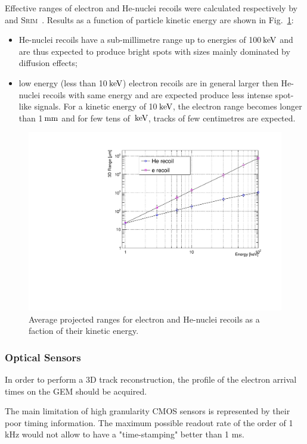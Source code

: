 \documentclass[physics,article,submit,moreauthors,pdftex]{Definitions/mdpi}
\newcommand{\SRIM} {{\textsc{Srim}}\xspace}
\newcommand{\unit}[1]{\ensuremath{\textrm{\,#1}}\xspace}
\newcommand{\keV}{\ensuremath{\,\textrm{ke\hspace{-.08em}V}}\xspace}
\begin{document}
 Effective ranges of electron and He-nuclei recoils were calculated
respectively by \GEANTfour~\cite{bib:geant} and
\SRIM~\cite{bib:srim}. Results as a function of particle kinetic
energy are shown in Fig.~\ref{fig:range}:
\begin{itemize}
    \item He-nuclei recoils have a sub-millimetre range up to energies
      of 100\keV and are thus expected to produce bright spots with
      sizes mainly dominated by diffusion effects;
    \item low energy (less than 10\keV) electron recoils are in
      general larger then He-nuclei recoils with same energy and are
      expected produce less intense spot-like signals. For a kinetic
      energy of 10\keV, the electron range becomes longer than
      1\unit{mm} and for few tens of \keV, tracks of few centimetres
      are expected.
\end{itemize}

\begin{figure}[ht]
  \begin{center}
    \includegraphics[width=0.49\linewidth]{range_ER_NR.pdf}
    \caption{Average projected ranges for electron and He-nuclei recoils as a faction of their kinetic energy.}
      \label{fig:range}
      \end{center}
\end{figure}

 
\subsubsection{Optical Sensors}

\label{sect:sensors}

In order to perform a 3D track reconstruction, the profile of the electron
arrival times on the GEM should be acquired.

The main limitation of high granularity CMOS sensors is 
represented by their poor timing information. The maximum possible readout rate of the order of 1 kHz would not allow to have a "time-stamping" better than 1 ms.
\end{document}

